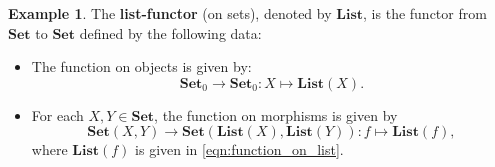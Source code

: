 \documentclass[a4paper,11pt, oneside,titlepage=false]{scrbook}
\theoremstyle{plain}
\theoremstyle{definition}
\newtheorem{exa}[thm]{Example}
\newcommand{\cfont}[1]{\ensuremath{\mathsf{#1}}}
\newcommand{\Catb}[1]{\mathbf{#1}}
\newcommand{\List}{\Catb{List}}
\newcommand{\SET}{\Catb{Set}}
\newcommand{\Ob}[1]{{#1}_0}
\newcommand{\CHom}[3]{{#1}(#2,#3)}
\newcommand{\Id}[1][]{\cfont{Id}_{#1}}
\newcommand{\Comp}{\cdot}
\begin{document}
\begin{exa} \label{example:functor_list} The \textbf{list-functor} (on sets), denoted by $\List$, is the functor from $\SET$ to $\SET$ defined by the following data:
\begin{itemize}
\item The function on objects is given by:
\[
\Ob{\SET}\to \Ob{\SET}: X\mapsto \List(X).
\]
\item For each $X,Y\in\SET$, the function on morphisms is given by
\[
\CHom{\SET}{X}{Y} \to \CHom{\SET}{\List(X)}{\List(Y)}: f\mapsto \List(f),
\]
where $\mathbf{List}(f)$ is given in \cref{eqn:function_on_list}.
\end{itemize}


\begin{comment}
\begin{proof}
The data is clearly well-defined since we work with \textit{mere} sets, i.e. no extra structure. That $\List$ would preserve the identity means that $\List(\Id[X]) = \Id[\List(X)]$, i.e. we have to show that for each $X$-valued list $\ell$, we have:
\[
\List(\Id[X])(\ell)) = \Id[\List(X)](A)(\ell).
\] 
The lefthand-side of the equation is given by:
$$\mathbf{List}(\Id[X])(\{x_i\}_i) = \{\Id[X] (x_i)\}_i = \{x_i\}_i,$$
where the first (resp. second) equality holds by definition of $\mathbf{List}$ on morphisms (resp. by definition of $\Id[X]$).\\
The righthand-side of the equation is given by:
$$\Id[\mathbf{List}(X)](A)(\{x_i\}_i) = \{x_i\}_i,$$
by definition of the identity morphism in $\SET$. Hence, the left and right hand side are equal which shows that $\mathbf{List}$ indeed preserves the identity.\\
We now show that $\mathbf{List}$ preserves composition. Let $f\in \CHom{\SET}{X}{Y}$ and $g\in \CHom{\SET}{Y}{Z}$ be functions. By definition of the composition in $\SET$ and by definition of $\mathbf{List}$ on morphisms, we have for each $X$-valued list $\{x_i\}_i$:
\begin{eqnarray}\label{eqn:functor_list_comp1}
\mathbf{List}(f\Comp g)(\{x_i\}_i) = \{(f\Comp g)(x_i)\}_i = \{g(f(x_i)\}_i.
\end{eqnarray}
Again by definition of the composition in $\SET$ and by definition of $\mathbf{List}$ on morphisms, we have for each $X$-valued list $\{x_i\}_i$:
\begin{eqnarray}\label{eqn:functor_list_comp2}
\left(\mathbf{List}(f)\Comp \mathbf{List}(g)\right)(\{x_i\}_i) = \mathbf{List}(g)\left(\{f(x_i)\}_i\right) = \{g(f(x_i)\}_i.
\end{eqnarray}
Hence, by combining \cref{eqn:functor_list_comp1, eqn:functor_list_comp2}, we conclude that for each $X$-valued list $\{x_i\}_i$ we have
\[
\mathbf{List}(f\Comp g)(\{x_i\}_i) = \left(\mathbf{List}(f)\Comp \mathbf{List}(g)\right)(\{x_i\}_i).
\]
Since this holds for every such list, we indeed have that the composition is preserved.
\end{proof}
\end{comment}
\end{exa}
\end{document}
